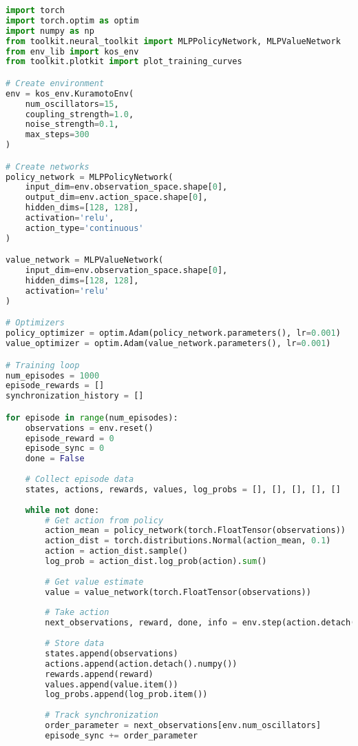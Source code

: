 \begin{lstlisting}[language=python, caption=PPO Training Example]
import torch
import torch.optim as optim
import numpy as np
from toolkit.neural_toolkit import MLPPolicyNetwork, MLPValueNetwork
from env_lib import kos_env
from toolkit.plotkit import plot_training_curves

# Create environment
env = kos_env.KuramotoEnv(
    num_oscillators=15,
    coupling_strength=1.0,
    noise_strength=0.1,
    max_steps=300
)

# Create networks
policy_network = MLPPolicyNetwork(
    input_dim=env.observation_space.shape[0],
    output_dim=env.action_space.shape[0],
    hidden_dims=[128, 128],
    activation='relu',
    action_type='continuous'
)

value_network = MLPValueNetwork(
    input_dim=env.observation_space.shape[0],
    hidden_dims=[128, 128],
    activation='relu'
)

# Optimizers
policy_optimizer = optim.Adam(policy_network.parameters(), lr=0.001)
value_optimizer = optim.Adam(value_network.parameters(), lr=0.001)

# Training loop
num_episodes = 1000
episode_rewards = []
synchronization_history = []

for episode in range(num_episodes):
    observations = env.reset()
    episode_reward = 0
    episode_sync = 0
    done = False
    
    # Collect episode data
    states, actions, rewards, values, log_probs = [], [], [], [], []
    
    while not done:
        # Get action from policy
        action_mean = policy_network(torch.FloatTensor(observations))
        action_dist = torch.distributions.Normal(action_mean, 0.1)
        action = action_dist.sample()
        log_prob = action_dist.log_prob(action).sum()
        
        # Get value estimate
        value = value_network(torch.FloatTensor(observations))
        
        # Take action
        next_observations, reward, done, info = env.step(action.detach().numpy())
        
        # Store data
        states.append(observations)
        actions.append(action.detach().numpy())
        rewards.append(reward)
        values.append(value.item())
        log_probs.append(log_prob.item())
        
        # Track synchronization
        order_parameter = next_observations[env.num_oscillators]
        episode_sync += order_parameter
        

\end{lstlisting}
